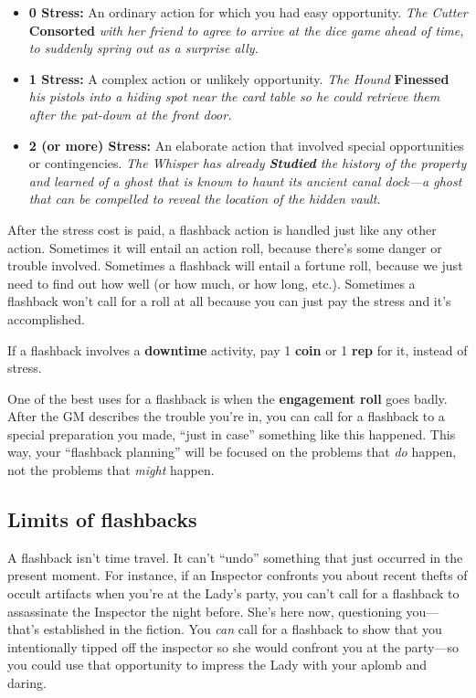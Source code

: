 \documentclass[11pt,fleqn,a5paper]{book}
\newcommand{\gameterm}[1]{\textbf{#1}}
\begin{document}
\begin{itemize}
	\item \gameterm{0 Stress:}  An ordinary action for which you had easy opportunity. \emph{The Cutter }\gameterm{Consorted} \emph{ with her friend to agree to arrive at the dice game ahead of time, to suddenly spring out as a surprise ally.}
	\item \gameterm{1 Stress:}  A complex action or unlikely opportunity. \emph{The Hound }\gameterm{Finessed} \emph{ his pistols into a hiding spot near the card table so he could retrieve them after the pat-down at the front door.}
	\item \gameterm{2 (or more) Stress:}  An elaborate action that involved special opportunities or contingencies. \emph{The Whisper has already \gameterm{Studied}  the history of the property and learned of a ghost that is known to haunt its ancient canal dock---a ghost that can be compelled to reveal the location of the hidden vault.}
\end{itemize}

After the stress cost is paid, a flashback action is handled just like any other action. Sometimes it will entail an action roll, because there’s some danger or trouble involved. Sometimes a flashback will entail a fortune roll, because we just need to find out how well (or how much, or how long, etc.). Sometimes a flashback won’t call for a roll at all because you can just pay the stress and it’s accomplished.

If a flashback involves a \textbf{downtime} activity, pay 1 \gameterm{coin}  or 1 \gameterm{rep}  for it, instead of stress.

One of the best uses for a flashback is when the \textbf{engagement roll} goes badly. After the GM describes the trouble you’re in, you can call for a flashback to a special preparation you made, “just in case” something like this happened. This way, your “flashback planning” will be focused on the problems that \emph{do }happen, not the problems that \emph{might} happen.

\subsection{Limits of flashbacks}

A flashback isn’t time travel. It can’t “undo” something that just occurred in the present moment. For instance, if an Inspector confronts you about recent thefts of occult artifacts when you’re at the Lady’s party, you can’t call for a flashback to assassinate the Inspector the night before. She’s here now, questioning you---that’s established in the fiction. You \emph{can} call for a flashback to show that you intentionally tipped off the inspector so she would confront you at the party---so you could use that opportunity to impress the Lady with your aplomb and daring.
\end{document}
